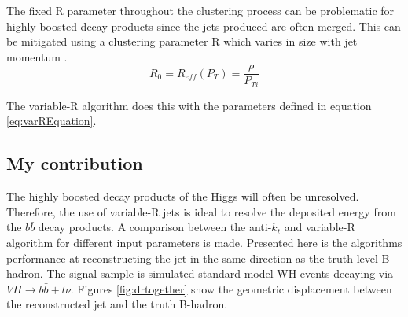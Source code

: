 The fixed R parameter throughout the clustering process can be problematic for highly boosted decay products since the jets produced are often merged. This can be mitigated using a clustering parameter R which varies in size with jet momentum \cite{varR}.         
\begin{equation}
\displaystyle
R_{0}= R_{eff}(P_{T})=\frac{\rho}{P_{Ti}}
\label{eq:varREquation}
\end{equation}

The variable-R algorithm does this with the parameters defined in equation \ref{eq:varREquation}.

\subsection{My contribution}
The highly boosted decay products of the Higgs will often be unresolved. Therefore, the use of variable-R jets is ideal to resolve the deposited energy from the $b\bar{b}$ decay products. A comparison between the anti-$k_t$ and variable-R algorithm for different input parameters is made. Presented here is the algorithms performance at reconstructing the jet in the same direction as the truth level B-hadron. The signal sample is simulated standard model WH events decaying via $VH \rightarrow b\bar{b} + l \nu $. Figures \ref{fig:drtogether} show the geometric displacement between the reconstructed jet and the truth B-hadron.   
